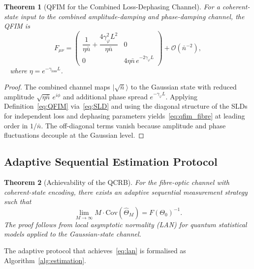 \documentclass[journal,twocolumn]{IEEEtran}
\theoremstyle{definition}
\theoremstyle{plain}
\newtheorem{theorem}{Theorem}[section]
\begin{document}
\begin{theorem}[QFIM for the Combined Loss-Dephasing Channel]
\label{thm:qfim_fibre}
For a coherent-state input to the combined amplitude-damping and
phase-damping channel, the QFIM is
\begin{equation}
  F_{\mu\nu} =
  \begin{pmatrix}
    \dfrac{1}{\eta\bar n} + \dfrac{4\gamma_\varphi^2 L^2}{\eta\bar n}
    & 0 \\[8pt]
    0 & 4\eta\bar n\,e^{-2\gamma_\varphi L}
  \end{pmatrix}
  + \mathcal{O}(\bar n^{-2}),
  \label{eq:qfim_fibre}
\end{equation}\
\centering
where $\eta = e^{-\gamma_{\mathrm{loss}} L}$.
\end{theorem}

\begin{proof}
The combined channel maps $|\sqrt{\bar n}\rangle$ to the Gaussian
state with reduced amplitude $\sqrt{\eta\bar n}\,e^{i\phi}$ and
additional phase spread $e^{-\gamma_\varphi L}$.  Applying
Definition~\ref{eq:QFIM} via~\eqref{eq:SLD} and using the diagonal
structure of the SLDs for independent loss and dephasing parameters
yields~\eqref{eq:qfim_fibre} at leading order in $1/\bar n$.  The
off-diagonal terms vanish because amplitude and phase fluctuations
decouple at the Gaussian level.
\end{proof}

\subsection{Adaptive Sequential Estimation Protocol}

\begin{theorem}[Achievability of the QCRB]
\label{thm:qcrb_achieve}
For the fibre-optic channel with coherent-state encoding, there
exists an adaptive sequential measurement strategy such that
\begin{equation}
  \lim_{M\to\infty} M\cdot \mathrm{Cov}(\hat\Theta_M) =
  F(\Theta_0)^{-1}.
  \label{eq:lan}
\end{equation}
The proof follows from local asymptotic normality (LAN) for
quantum statistical models applied to the Gaussian-state channel.
\end{theorem}

The adaptive protocol that achieves~\eqref{eq:lan} is formalised
as Algorithm~\ref{alg:estimation}.
\end{document}
